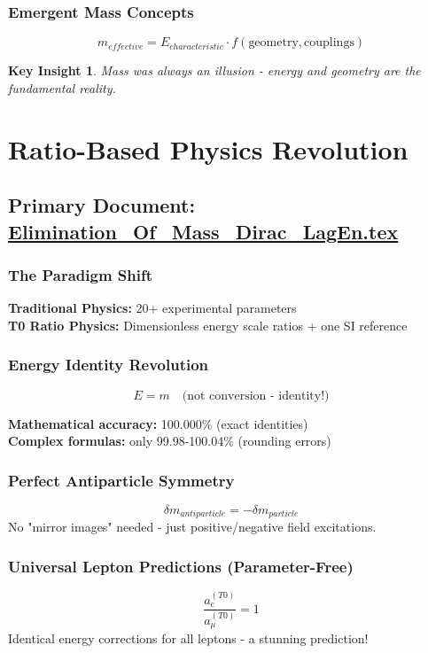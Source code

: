 \documentclass[12pt,a4paper]{report}
\newtheorem{insight}{Key Insight}[chapter]
\begin{document}
	\subsubsection{Emergent Mass Concepts}
	$$m_{effective} = E_{characteristic} \cdot f(\text{geometry}, \text{couplings})$$
	
	\begin{insight}
		Mass was always an illusion - energy and geometry are the fundamental reality.
	\end{insight}
	
	\section{Ratio-Based Physics Revolution}
	\subsection{Primary Document: \href{https://github.com/jpascher/T0-Time-Mass-Duality/tree/main/2/pdf/Elimination_Of_Mass_Dirac_LagEn.pdf}{Elimination\_Of\_Mass\_Dirac\_LagEn.tex}}
	
	\subsubsection{The Paradigm Shift}
	\textbf{Traditional Physics:} 20+ experimental parameters\\
	\textbf{T0 Ratio Physics:} Dimensionless energy scale ratios + one SI reference
	
	\subsubsection{Energy Identity Revolution}
	$$E = m \quad \text{(not conversion - identity!)}$$
	
	\textbf{Mathematical accuracy:} 100.000\% (exact identities)\\
	\textbf{Complex formulas:} only 99.98-100.04\% (rounding errors)
	
	\subsubsection{Perfect Antiparticle Symmetry}
	$$\delta m_{antiparticle} = -\delta m_{particle}$$
	No "mirror images" needed - just positive/negative field excitations.
	
	\subsubsection{Universal Lepton Predictions (Parameter-Free)}
	$$\frac{a_e^{(T0)}}{a_\mu^{(T0)}} = 1$$
	Identical energy corrections for all leptons - a stunning prediction!
	
\end{document}

